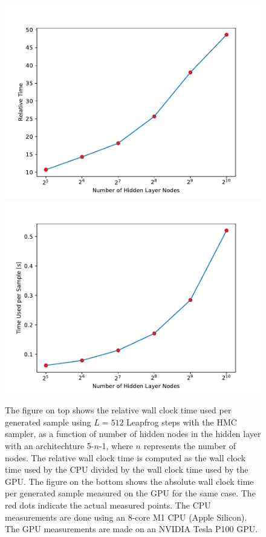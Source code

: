 \begin{figure}[H]
    \centering
    \includegraphics[scale=0.7]{figures/cpu_vs_gpu/cpu_vs_gpu_performance.pdf}
    \includegraphics[scale=0.7]{figures/cpu_vs_gpu/gpu_training_time.pdf}
    \caption{The figure on top shows the relative wall clock time used per generated sample using $L = 512$ Leapfrog steps with the HMC sampler,
    as a function of number of hidden nodes in the hidden layer with an architechture 5-$n$-1, where $n$ represents the number of nodes. The relative wall clock time is computed as the wall clock time used by the CPU divided by the wall clock time used by the GPU. The figure on the bottom shows the absolute wall clock time per generated sample measured on the GPU for the same case. The red dots indicate the actual measured points. The CPU measurements are done using an 8-core M1 CPU (Apple Silicon). The GPU measurements
    are made on an NVIDIA Tesla P100 GPU.
    }
    \label{fig:relative_performance}
\end{figure}

